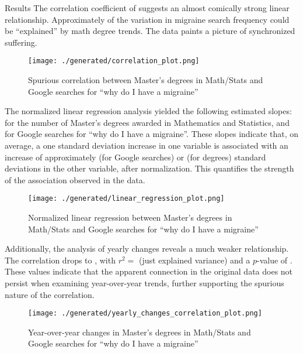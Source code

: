 \documentclass{article}
\newcommand\minput[1]{%
  \ifhmode\ifnum\lastnodetype=11 \unskip\fi\fi}
\begin{document}
\pagebreak

\begin{section}{Results}
 The correlation coefficient of \minput{generated/correlation_value.tex} suggests an almost comically strong linear relationship. Approximately \minput{generated/r_squared_percentage_value.tex} of the variation in migraine search frequency could be ``explained'' by math degree trends. The data paints a picture of synchronized suffering.

 \begin{figure}[H]
   \centering
   \texttt{[image: ./generated/correlation\_plot.png]}
   \caption{Spurious correlation between Master's degrees in Math/Stats and Google searches for ``why do I have a migraine''}
   \label{fig:correlation}
 \end{figure}

 The normalized linear regression analysis yielded the following estimated slopes: \minput{generated/nces_slope_value.tex} for the number of Master's degrees awarded in Mathematics and Statistics, and \minput{generated/google_slope_value.tex} for Google searches for ``why do I have a migraine''. These slopes indicate that, on average, a one standard deviation increase in one variable is associated with an increase of approximately \minput{generated/google_slope_value.tex} (for Google searches) or \minput{generated/nces_slope_value.tex} (for degrees) standard deviations in the other variable, after normalization. This quantifies the strength of the association observed in the data.

 \begin{figure}[H]
   \centering
   \texttt{[image: ./generated/linear\_regression\_plot.png]}
   \caption{Normalized linear regression between Master's degrees in Math/Stats and Google searches for ``why do I have a migraine''}
   \label{fig:linear_regression}
 \end{figure}

 Additionally, the analysis of yearly changes reveals a much weaker relationship. The correlation drops to \minput{generated/yearly_changes_correlation_value.tex}, with $r^2 =$ \minput{generated/yearly_changes_r_squared_value.tex} (just \minput{generated/yearly_changes_r_squared_percentage_value.tex} explained variance) and a $p$-value of \minput{generated/yearly_changes_p_value.tex}. These values indicate that the apparent connection in the original data does not persist when examining year-over-year trends, further supporting the spurious nature of the correlation.

 \begin{figure}[H]
   \centering
   \texttt{[image: ./generated/yearly\_changes\_correlation\_plot.png]}
   \caption{Year-over-year changes in Master's degrees in Math/Stats and Google searches for ``why do I have a migraine''}
   \label{fig:yearly_changes}
 \end{figure}

\end{section}
\end{document}
